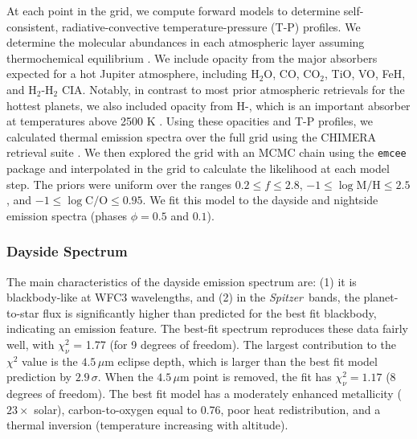 \documentclass[twocolumn]{aastex61}
\newcommand{\project}[1]{\textsl{#1}}
\newcommand{\Spitzer}{\project{Spitzer}}
\begin{document}
At each point in the grid, we compute forward models to determine self-consistent, radiative-convective temperature-pressure (T-P) profiles. We determine the molecular abundances in each atmospheric layer assuming thermochemical equilibrium \citep[calculated with the NASA CEA routine;][]{gordon94}.  We include opacity from the major absorbers expected for a hot Jupiter atmosphere, including H$_2$O, CO, CO$_2$, TiO, VO, FeH, and H$_2$-H$_2$ CIA. Notably, in contrast to most prior atmospheric retrievals for the hottest planets, we also included opacity from H-, which is an important absorber at temperatures above 2500 K \citep{arcangeli18, parmentier18}.  Using these opacities and T-P profiles, we calculated thermal emission spectra over the full grid using the CHIMERA retrieval suite \citep[described in][]{line13a, line14}.  We then explored the grid with an MCMC chain using the \texttt{emcee} package \citep{foremanmackey13} and interpolated in the grid to calculate the likelihood at each model step. The priors were uniform over the ranges $0.2 \le f \le 2.8$, $-1\le \log{\mathrm{M/H}} \le 2.5$, and $-1 \le \log{\mathrm{C/O}} \le 0.95$.  We fit this model to the dayside and nightside emission spectra (phases $\phi = 0.5$ and $0.1$). 

\subsubsection{Dayside Spectrum}
The main characteristics of the dayside emission spectrum are: (1) it is blackbody-like at WFC3 wavelengths, and (2) in the \Spitzer\ bands, the planet-to-star flux is significantly higher than predicted for the best fit blackbody, indicating an emission feature.  The best-fit spectrum reproduces these data fairly well, with $\chi^2_\nu$ = 1.77 (for 9 degrees of freedom). The largest contribution to the $\chi^2$ value is the $4.5\,\mu$m eclipse depth, which is larger than the best fit model prediction by $2.9\,\sigma$. When the $4.5\,\mu$m point is removed, the fit has $\chi^2_\nu = 1.17$ (8 degrees of freedom).  The best fit model has a moderately enhanced metallicity ($23\times$ solar), carbon-to-oxygen equal to 0.76, poor heat redistribution, and a thermal inversion (temperature increasing with altitude).
\end{document}
